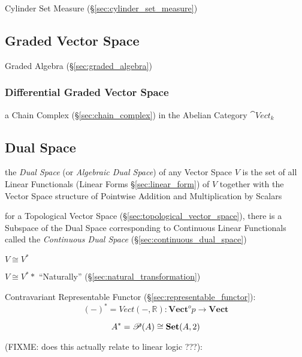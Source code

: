 Cylinder Set Measure (\S\ref{sec:cylinder_set_measure})



\subsection{Graded Vector Space}\label{sec:graded_vectorspace}

Graded Algebra (\S\ref{sec:graded_algebra})



\subsubsection{Differential Graded Vector Space}\label{sec:differential_graded}

a Chain Complex (\S\ref{sec:chain_complex}) in the Abelian Category
$\cat{Vect}_k$



\subsection{Dual Space}\label{sec:dual_space}

the \emph{Dual Space} (or \emph{Algebraic Dual Space}) of any Vector Space $V$
is the set of all Linear Functionals (Linear Forms \S\ref{sec:linear_form}) of
$V$ together with the Vector Space structure of Pointwise Addition and
Multiplication by Scalars

for a Topological Vector Space (\S\ref{sec:topological_vector_space}), there is
a Subspace of the Dual Space corresponding to Continuous Linear Functionals
called the \emph{Continuous Dual Space} (\S\ref{sec:continuous_dual_space})

$V \cong V^*$

$V \cong V^**$ ``Naturally'' (\S\ref{sec:natural_transformation})

Contravariant Representable Functor
(\S\ref{sec:representable_functor}):
\[
  (-)^* = Vect(-,\mathbb{R}) :
    \mathbf{Vect}^op \rightarrow \mathbf{Vect}
\]

\[
  A^* = \mathscr{P}(A) \cong \mathbf{Set}(A,2)
\]\cite{awodey06}

(FIXME: does this actually relate to linear logic ???):


